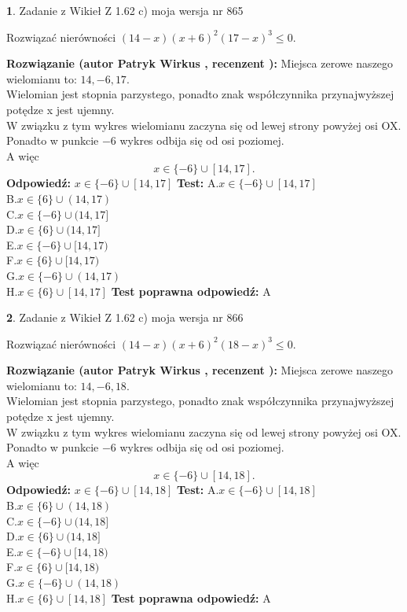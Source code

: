 \documentclass[12pt, a4paper]{article}
\theoremstyle{definition} %
\newtheorem{zad}{}
\newcommand{\zadStart}[1]{\begin{zad}#1\newline}
\newcommand{\zadStop}{\end{zad}}
\newcommand{\rozwStart}[2]{\noindent \textbf{Rozwiązanie (autor #1 , recenzent #2): }\newline}
\newcommand{\rozwStop}{\newline}
\newcommand{\odpStart}{\noindent \textbf{Odpowiedź:}\newline}
\newcommand{\odpStop}{\newline}
\newcommand{\testStart}{\noindent \textbf{Test:}\newline}
\newcommand{\testStop}{\newline}
\newcommand{\kluczStart}{\noindent \textbf{Test poprawna odpowiedź:}\newline}
\newcommand{\kluczStop}{\newline}
\begin{document}
\zadStart{Zadanie z Wikieł Z 1.62 c) moja wersja nr 865}

Rozwiązać nierówności $(14-x)(x+6)^{2}(17-x)^{3}\le0$.
\zadStop
\rozwStart{Patryk Wirkus}{}
Miejsca zerowe naszego wielomianu to: $14, -6, 17$.\\
Wielomian jest stopnia parzystego, ponadto znak współczynnika przy\linebreak najwyższej potędze x jest ujemny.\\ W związku z tym wykres wielomianu zaczyna się od lewej strony powyżej osi OX.\\
Ponadto w punkcie $-6$ wykres odbija się od osi poziomej.\\
A więc $$x \in \{-6\} \cup [14,17].$$
\rozwStop
\odpStart
$x \in \{-6\} \cup [14,17]$
\odpStop
\testStart
A.$x \in \{-6\} \cup [14,17]$\\
B.$x \in \{6\} \cup (14,17)$\\
C.$x \in \{-6\} \cup (14,17]$\\
D.$x \in \{6\} \cup (14,17]$\\
E.$x \in \{-6\} \cup [14,17)$\\
F.$x \in \{6\} \cup [14,17)$\\
G.$x \in \{-6\} \cup (14,17)$\\
H.$x \in \{6\} \cup [14,17]$
\testStop
\kluczStart
A
\kluczStop



\zadStart{Zadanie z Wikieł Z 1.62 c) moja wersja nr 866}

Rozwiązać nierówności $(14-x)(x+6)^{2}(18-x)^{3}\le0$.
\zadStop
\rozwStart{Patryk Wirkus}{}
Miejsca zerowe naszego wielomianu to: $14, -6, 18$.\\
Wielomian jest stopnia parzystego, ponadto znak współczynnika przy\linebreak najwyższej potędze x jest ujemny.\\ W związku z tym wykres wielomianu zaczyna się od lewej strony powyżej osi OX.\\
Ponadto w punkcie $-6$ wykres odbija się od osi poziomej.\\
A więc $$x \in \{-6\} \cup [14,18].$$
\rozwStop
\odpStart
$x \in \{-6\} \cup [14,18]$
\odpStop
\testStart
A.$x \in \{-6\} \cup [14,18]$\\
B.$x \in \{6\} \cup (14,18)$\\
C.$x \in \{-6\} \cup (14,18]$\\
D.$x \in \{6\} \cup (14,18]$\\
E.$x \in \{-6\} \cup [14,18)$\\
F.$x \in \{6\} \cup [14,18)$\\
G.$x \in \{-6\} \cup (14,18)$\\
H.$x \in \{6\} \cup [14,18]$
\testStop
\kluczStart
A
\kluczStop
\end{document}
